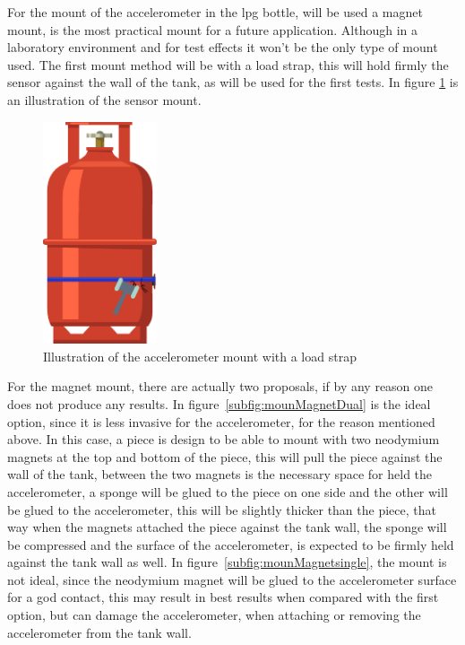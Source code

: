 For the mount of the accelerometer in the \acrshort{lpg} bottle, will be used a magnet mount, is the most practical mount for a future application. Although in a laboratory environment and for test effects it won't be the only type of mount used. The first mount method will be with a load strap, this will hold firmly the sensor against the wall of the tank, as will be used for the first tests. In figure \ref{fig:mounLoadStrap} is an illustration of the sensor mount.
\begin{figure}[]
    \centering
    \includegraphics[width=0.3\textwidth]{Chapters/4CHP/Figures/AccLoadStrap.eps}
    \caption{Illustration of the accelerometer mount with a load strap}
    \label{fig:mounLoadStrap}
\end{figure}
For the magnet mount, there are actually two proposals, if by any reason one does not produce any results. In figure~\ref{subfig:mounMagnetDual} is the ideal option, since it is less invasive for the accelerometer, for the reason mentioned above. In this case, a piece is design to be able to mount with two neodymium magnets at the top and bottom of the piece, this will pull the piece against the wall of the tank, between the two magnets is the necessary space for held the accelerometer, a sponge will be glued to the piece on one side and the other will be glued to the accelerometer, this will be slightly thicker than the piece, that way when the magnets attached the piece against the tank wall, the sponge will be compressed and the surface of the accelerometer, is expected to be firmly held against the tank wall as well. In figure~\ref{subfig:mounMagnetsingle}, the mount is not ideal, since the neodymium magnet will be glued to the accelerometer surface for a god contact, this may result in best results when compared with the first option, but can damage the accelerometer, when attaching or removing the accelerometer from the tank wall.
